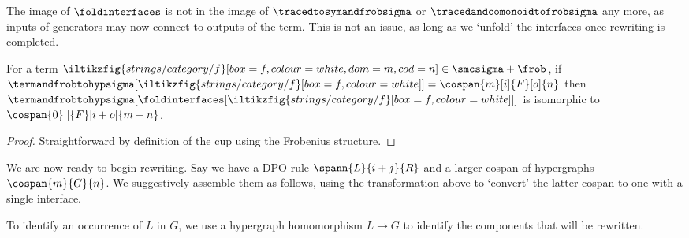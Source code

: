 The image of \(\foldinterfaces\) is not in the image of
\(\tracedtosymandfrobsigma\) or \(\tracedandcomonoidtofrobsigma\) any more,
as inputs of generators may now connect to outputs of the term.
This is not an issue, as long as we `unfold' the interfaces once rewriting is
completed.

\begin{proposition}
    For a term \(
    \iltikzfig{strings/category/f}[box=f,colour=white,dom=m,cod=n]
    \in
    \smcsigma + \frob
    \), if \(
    \termandfrobtohypsigma[\iltikzfig{strings/category/f}[box=f,colour=white]]
    =
    \cospan{m}[i]{F}[o]{n}
    \) then \(
    \termandfrobtohypsigma[
        \foldinterfaces[
            \iltikzfig{strings/category/f}[box=f,colour=white]
        ]
    ]
    \) is isomorphic to \(
    \cospan{0}[]{F}[i+o]{m + n}
    \).
\end{proposition}
\begin{proof}
    Straightforward by definition of the cup using the Frobenius structure.
\end{proof}

We are now ready to begin rewriting.
Say we have a DPO rule \(\spann{L}{i + j}{R}\) and a larger cospan of
hypergraphs \(\cospan{m}{G}{n}\).
We suggestively assemble them as follows, using the transformation above to
`convert' the latter cospan to one with a single interface.

\begin{center}
\end{center}

To identify an occurrence of \(L\) in \(G\), we use a
hypergraph homomorphism \(L \to G\) to identify the components that will be
rewritten.

\begin{center}
\end{center}

